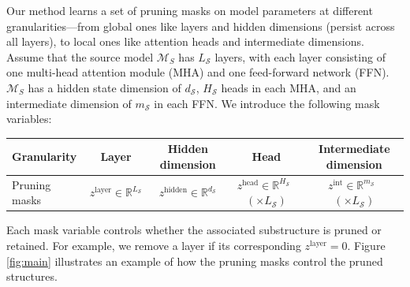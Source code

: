 Our method learns a set of pruning masks 
on  model parameters at different granularities---from 
global ones like layers and hidden dimensions (persist across all layers),
to local ones like attention heads and intermediate dimensions. 
Assume that the source model $\mathcal{M}_S$ has  
$L_\mathcal{S}$ layers, with each layer consisting of one multi-head attention module (MHA) and one feed-forward network (FFN). $\mathcal{M}_S$ has a hidden state dimension of $d_\mathcal{S}$, 
$H_\mathcal{S}$ heads in each MHA, and
an intermediate dimension of $m_\mathcal{S}$ in each FFN. We introduce the following mask variables:
\begin{table}[h]
  \centering
  \small
  \vspace{-5pt}
  \begin{tabular}{lcccc}
     \toprule
     Granularity & Layer & Hidden dimension & Head & Intermediate dimension\\
     \midrule
     Pruning masks & ${z}^{\text{layer}} \in \mathbb{R}^{L_\mathcal{S}}$ & 
     ${z}^{\text{hidden}} \in \mathbb{R}^{d_\mathcal{S}}$ & 
     ${z}^{\text{head}} \in \mathbb{R}^{H_\mathcal{S}}$~$(\times L_\mathcal{S})$ & 
     ${z}^{\text{int}} \in \mathbb{R}^{m_\mathcal{S}}$~$(\times L_\mathcal{S})$  \\
     \bottomrule
  \end{tabular}
  \vspace{-9pt}
\end{table}

Each mask variable controls whether the associated substructure is pruned or retained. For example, we remove a layer if its corresponding $z^{\text{layer}}=0$. Figure \ref{fig:main} illustrates an example of how the pruning masks control the pruned structures.

